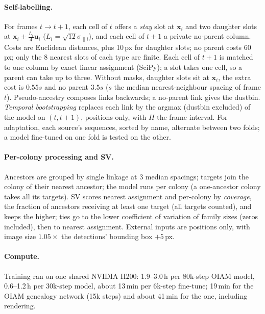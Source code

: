 \paragraph{Self-labelling.}
For frames $t\to t{+}1$, each cell of $t$ offers a \emph{stay} slot at $\mathbf{x}_i$ and two daughter slots at $\mathbf{x}_i\pm\frac{L_i}{4}\mathbf{u}_i$ ($L_i=\sqrt{12}\sigma_{\parallel i}$), and each cell of $t{+}1$ a private no-parent column.
Costs are Euclidean distances, plus 10\,px for daughter slots; no parent costs 60\,px; only the 8 nearest slots of each type are finite.
Each cell of $t{+}1$ is matched to one column by exact linear assignment (SciPy); a slot takes one cell, so a parent can take up to three.
Without masks, daughter slots sit at $\mathbf{x}_i$, the extra cost is $0.55s$ and no parent $3.5s$ ($s$ the median nearest-neighbour spacing of frame $t$).
Pseudo-ancestry composes links backwards; a no-parent link gives the dustbin.
\emph{Temporal bootstrapping} replaces each link by the argmax (dustbin excluded) of the \rodsim model on $(t,t{+}1)$, positions only, with $H$ the frame interval.
For adaptation, each source's sequences, sorted by name, alternate between two folds; a model fine-tuned on one fold is tested on the other.

\paragraph{Per-colony processing and SV.}
Ancestors are grouped by single linkage at 3 median spacings; targets join the colony of their nearest ancestor; the \rodsim model runs per colony (a one-ancestor colony takes all its targets).
SV scores nearest assignment and per-colony \ours by \emph{coverage}, the fraction of ancestors receiving at least one target (all targets counted), and keeps the higher; ties go to the lower coefficient of variation of family sizes (zeros included), then to nearest assignment.
External inputs are positions only, with image size $1.05\times$ the detections' bounding box ${+}5$\,px.

\paragraph{Compute.}
Training ran on one shared NVIDIA H200: 1.9--3.0\,h per 80k-step OIAM model, 0.6--1.2\,h per 30k-step \rodsim model, about 13\,min per 6k-step fine-tune; 19\,min for the OIAM genealogy network (15k steps) and about 41\,min for the \rodsim one, including rendering.
